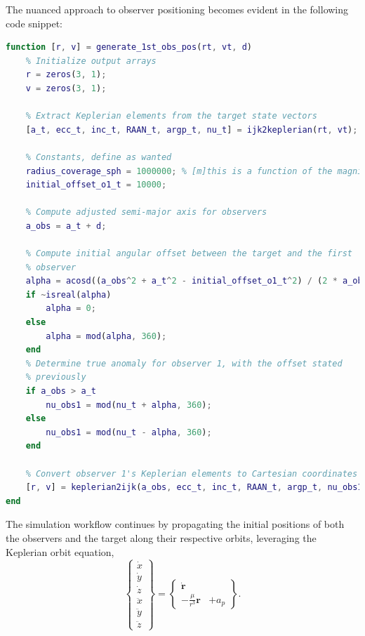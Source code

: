 The nuanced approach to observer positioning becomes evident in the following code snippet:

\begin{lstlisting}[language=Matlab, caption= Excerpt of function \textit{generate\_position\_1st\_obs.m}.]
    function [r, v] = generate_1st_obs_pos(rt, vt, d)
    % Initialize output arrays
    r = zeros(3, 1);
    v = zeros(3, 1);

    % Extract Keplerian elements from the target state vectors
    [a_t, ecc_t, inc_t, RAAN_t, argp_t, nu_t] = ijk2keplerian(rt, vt);

    % Constants, define as wanted
    radius_coverage_sph = 1000000; % [m]this is a function of the magnitude
    initial_offset_o1_t = 10000;

    % Compute adjusted semi-major axis for observers
    a_obs = a_t + d;

    % Compute initial angular offset between the target and the first
    % observer
    alpha = acosd((a_obs^2 + a_t^2 - initial_offset_o1_t^2) / (2 * a_obs * a_t));
    if ~isreal(alpha)
        alpha = 0;
    else
        alpha = mod(alpha, 360);
    end
    % Determine true anomaly for observer 1, with the offset stated
    % previously
    if a_obs > a_t
        nu_obs1 = mod(nu_t + alpha, 360);
    else
        nu_obs1 = mod(nu_t - alpha, 360);
    end

    % Convert observer 1's Keplerian elements to Cartesian coordinates
    [r, v] = keplerian2ijk(a_obs, ecc_t, inc_t, RAAN_t, argp_t, nu_obs1);
end
\end{lstlisting}

The simulation workflow continues by propagating the initial positions of both the observers and the target along their respective orbits, leveraging the Keplerian orbit equation,
\begin{equation}
    \label{eq:state}
    \left\{\begin{aligned}\dot{x}\\\dot{y}\\\dot{z}\\\ddot{x}\\\ddot{y}\\\ddot{z}\end{aligned}\right\}=\left\{\begin{aligned}\dot{\boldsymbol{r}}&\\-\frac{\mu}{r^3}\boldsymbol{r}&+a_p\end{aligned}\right\}.
\end{equation}


